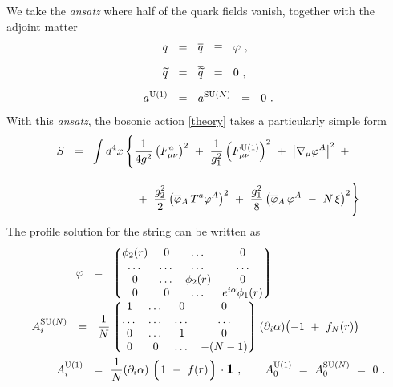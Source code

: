 \documentclass[12pt]{article}
\newcommand{\p}{\partial}
\newcommand{\wt}{\widetilde}
\newcommand{\ov}{\overline}
\newcommand{\lgr}{\left\lgroup}
\newcommand{\rgr}{\right\rgroup}
\newcommand{\aU}{a^{\rm U(1)}}
\newcommand{\aN}{a^\text{SU($N$)}}
\begin{document}
	We take the {\it ansatz} where half of the quark fields vanish, together with the adjoint matter
\begin{align*}
%
	q       & ~~=~~ \ov{q} ~~\equiv~~ \varphi~,  \\[2mm]
%
	\wt{q}  & ~~=~~ \ov{\wt{q}} ~~=~~ 0~, \\[2mm]
%
	\aU     & ~~=~~ \aN ~~=~~ 0~. 
\end{align*}
	With this {\it ansatz}, the bosonic action \eqref{theory} takes a particularly simple form
\begin{align}
%
\notag
	S ~~=~~ & \int d^4x\, 
	\Biggl\{  \frac{1}{4g^2}\left( F_{\mu\nu}^a \right)^2  ~+~ 
		 \frac{1}{g_1^2}\left( F_{\mu\nu}^{\rm U(1)} \right)^2 ~+~
		 \left| \nabla_\mu \varphi^A \right|^2 ~+~ \\[3mm]
%
\label{redmodel}
	        & \phantom{ \int d^4x\, \Biggl\{ }
		~+~
		 \frac{g_2^2}{2} \left( \ov{\varphi}{}_A\,T^a\varphi^A \right)^2 ~+~
		 \frac{g_1^2}{8} \left( \ov{\varphi}{}_A\, \varphi^A ~-~ N\,\xi \right)^2
	\Biggr\}
\end{align}
	The profile solution for the string can be written as \cite{ABEKY}
\begin{align}
%
\notag
	\varphi   ~~=~~  &
		\lgr \begin{matrix}
			\phi_2(r) & 0     & \dots      & 0      \\
			\dots     & \dots & \dots      & \dots  \\
			0         & \dots & \phi_2(r)  & 0      \\
			0         &  0    & \dots      & e^{i\alpha}\phi_1(r) 
		     \end{matrix} \rgr
	\\
%
\label{string_reg}
	\\[-0.7cm]
%
\notag
	A_i^\text{SU($N$)}  ~~=~~
		\frac{1}{N} & \lgr \begin{matrix}
        			    	1       &   \dots   &  0       &   0   \\
        				\dots   &   \dots   &  \dots   & \dots \\
        				0       &   \dots   &  1       &   0   \\
        				0       &     0     &  \dots   & - (N-1) 
	   		         \end{matrix} \rgr
		(\p_i\alpha)\bigl( -1 ~+~ f_{N}(r) \bigr)
	\\
%
\notag
	A_i^{\rm U(1)}  ~~=~~ & \frac{1}{N}(\p_i\alpha)\lgr 1 ~-~ f(r) \rgr \cdot \mathlarger{\mathbf{1}}~,
	\qquad 
	A_0^{\rm U(1)} ~=~ A_0^\text{SU($N$)} ~=~ 0~.
\end{align}
\end{document}
